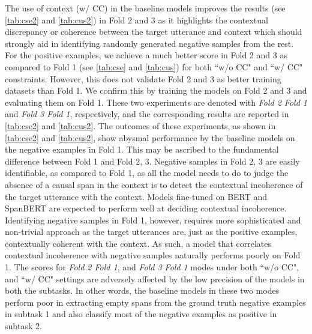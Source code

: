 \documentclass[11pt,a4paper]{article}
\theoremstyle{definition}
\begin{document}
The use of context (w/ CC) in the baseline models improves the results (see \cref{tab:cse2} and \ref{tab:cus2}) in Fold 2 and 3 as it highlights the contextual discrepancy or coherence between the target utterance and context which should strongly aid in identifying randomly generated negative samples from the rest. For the positive examples, we achieve a much better score in Fold 2 and 3 as compared to Fold 1 (see \cref{tab:cse} and \cref{tab:cus}) for both ``w/o CC" and ``w/ CC" constraints. However, this does not validate Fold 2 and 3 as better training datasets than Fold 1. We confirm this by training the models on Fold 2 and 3 and evaluating them on Fold 1. These two experiments are denoted with \emph{Fold 2  Fold 1} and \emph{Fold 3  Fold 1}, respectively, and the corresponding results are reported in \cref{tab:cse2} and \ref{tab:cus2}. The outcomes of these experiments, as shown in \cref{tab:cse2} and \ref{tab:cus2}, show abysmal performance by the baseline models on the negative examples in Fold 1. 
This may be ascribed to the fundamental difference between Fold 1 and Fold 2, 3. Negative samples in Fold 2, 3 are easily identifiable, as compared to Fold 1, as all the model needs to do to judge the absence of a causal span in the context is to detect the contextual incoherence of the target utterance with the context. Models fine-tuned on BERT and SpanBERT are expected to perform well at deciding contextual incoherence. Identifying negative samples in Fold 1, however, requires more sophisticated and non-trivial approach as the target utterances are, just as the positive examples, contextually coherent with the context. As such, a model that correlates contextual incoherence with negative samples naturally performs poorly on Fold 1.
The  scores for \emph{Fold 2  Fold 1}, and \emph{Fold 3  Fold 1} modes under both ``w/o CC", and ``w/ CC" settings are adversely affected by the low precision of the models in both the subtasks. In other words, the baseline models in these two modes perform poor in extracting empty spans from the ground truth negative examples in subtask 1 and also classify most of the negative examples as positive in subtask 2.
\end{document}
